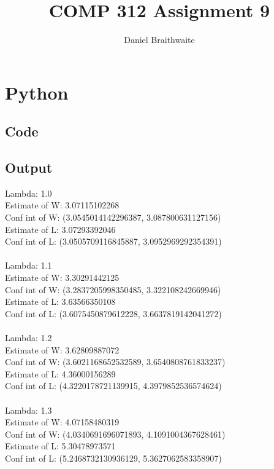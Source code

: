 \documentclass{article}
\title{COMP 312 Assignment 9}
\author{Daniel Braithwaite}
\begin{document}
	\maketitle
	\newpage
  	
  	\section{Python}
		\subsection{Code}
				
		\subsection{Output}
			Lambda:  1.0\\
	Estimate of W: 3.07115102268\\
	Conf int of W: (3.0545014142296387, 3.087800631127156)\\
	Estimate of L: 3.07293392046\\
	Conf int of L: (3.0505709116845887, 3.0952969292354391)\\
\\
Lambda:  1.1\\
	Estimate of W: 3.30291442125\\
	Conf int of W: (3.2837205998350485, 3.322108242669946)\\
	Estimate of L: 3.63566350108\\
	Conf int of L: (3.6075450879612228, 3.6637819142041272)\\
\\
Lambda:  1.2\\
	Estimate of W: 3.62809887072\\
	Conf int of W: (3.6021168652532589, 3.6540808761833237)\\
	Estimate of L: 4.36000156289\\
	Conf int of L: (4.3220178721139915, 4.3979852536574624)\\
\\
Lambda:  1.3\\
	Estimate of W: 4.07158480319\\
	Conf int of W: (4.0340691696071893, 4.1091004367628461)\\
	Estimate of L: 5.30478973571\\
	Conf int of L: (5.2468732130936129, 5.3627062583358907)\\
\\
\end{document}
